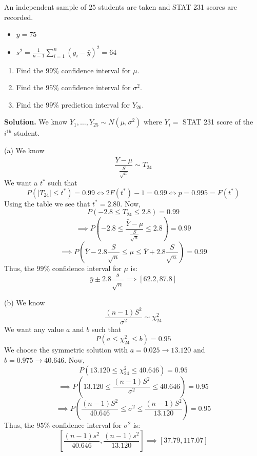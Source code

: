 \begin{exbox}
    \begin{example}
        An independent sample of $ 25 $ students are taken and STAT 231 scores are recorded.
        \begin{itemize}
            \item $ \bar{y}=75 $
            \item $ s^2=\frac{1}{n-1} \sum\limits_{i=1}^{n} (y_i-\bar{y})^2=64 $
        \end{itemize}
        \begin{enumerate}[label=(\alph*)]
            \item Find the $ 99\% $ confidence interval for $ \mu $.
            \item Find the $ 95\% $ confidence interval for $ \sigma^2 $.
            \item Find the $ 99\% $ prediction interval for $ Y_{26} $.
        \end{enumerate}
        \textbf{Solution.} We know $ Y_1,\ldots ,Y_{25} \sim N(\mu,\sigma^2) $
        where $ Y_i= $ STAT 231 score of the $ i^{\text{th}} $ student.

        (a) We know
        \[ \frac{\bar{Y}-\mu}{\frac{S}{\sqrt{n}}} \sim T_{24} \]
        We want a $ t^* $ such that
        \[ P(|T_{24}|\leqslant t^*)=0.99\iff 2F(t^*)-1=0.99\iff p=0.995=F(t^*) \]
        Using the table we see that $ t^*=2.80 $. Now,
        \[ P(-2.8\leqslant T_{24}\leqslant 2.8)=0.99 \]
        \[ \implies P\left(-2.8\leqslant \frac{\bar{Y}-\mu}{\frac{S}{\sqrt{n}}}
            \leqslant 2.8\right)=0.99 \]
        \[ \implies P\left(\bar{Y}-2.8 \frac{S}{\sqrt{n}}\leqslant \mu\leqslant \bar{Y}+
            2.8 \frac{S}{\sqrt{n}}\right)=0.99 \]
        Thus, the $ 99\% $ confidence interval for $ \mu $ is:
        \[ \bar{y}\pm 2.8 \frac{s}{\sqrt{n}}\implies \left[ 62.2, 87.8 \right] \]

        (b) We know
        \[ \frac{(n-1)S^2}{\sigma^2} \sim \chi^2_{24}  \]
        We want any value $ a $ and $ b $ such that
        \[ P(a\leqslant \chi^2_{24}\leqslant b)=0.95 \]
        We choose the symmetric solution with $ a=0.025\rightarrow 13.120 $ and $ b=0.975\rightarrow 40.646 $.
        Now,
        \[ P\left( 13.120\leqslant \chi^2_{24}\leqslant 40.646 \right)=0.95 \]
        \[ \implies P\left( 13.120\leqslant \frac{(n-1) S^2}{\sigma^2}\leqslant 40.646 \right)=0.95 \]
        \[ \implies P\left( \frac{(n-1)S^2}{40.646}\leqslant \sigma^2 \leqslant \frac{(n-1)S^2}{13.120} \right)=0.95 \]
        Thus, the $ 95\% $ confidence interval for $ \sigma^2 $ is:
        \[ \left[ \frac{(n-1)s^2}{40.646} , \frac{(n-1)s^2}{13.120} \right]\implies
            \left[ 37.79, 117.07 \right] \]


\end{example}
\end{exbox}
